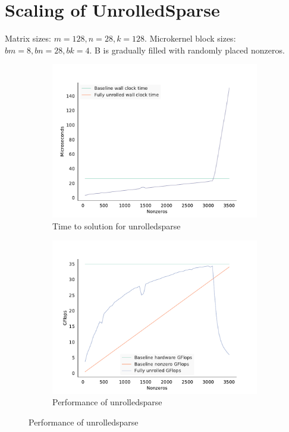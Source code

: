 \section{Scaling of UnrolledSparse}
\label{section:exp_unrolled_scaling}


  Matrix sizes: $m=128, n=28, k=128$.
  Microkernel block sizes: $bm=8, bn=28, bk=4$.
  B is gradually filled with randomly placed nonzeros.

  \begin{figure}[!htb]
  	\centering
    \begin{subfigure}[b]{0.8\textwidth}
      \centering
      \includegraphics[width=\textwidth]{images/fig2.pdf}
      \caption{Time to solution for unrolledsparse}
      \label{fig:unrolled_time}
    \end{subfigure}
    \begin{subfigure}[b]{0.8\textwidth}
      \centering
      \includegraphics[width=\textwidth]{images/fig3.pdf}
      \caption{Performance of unrolledsparse}
      \label{fig:unrolled_perf}
    \end{subfigure}
  \end{figure}

